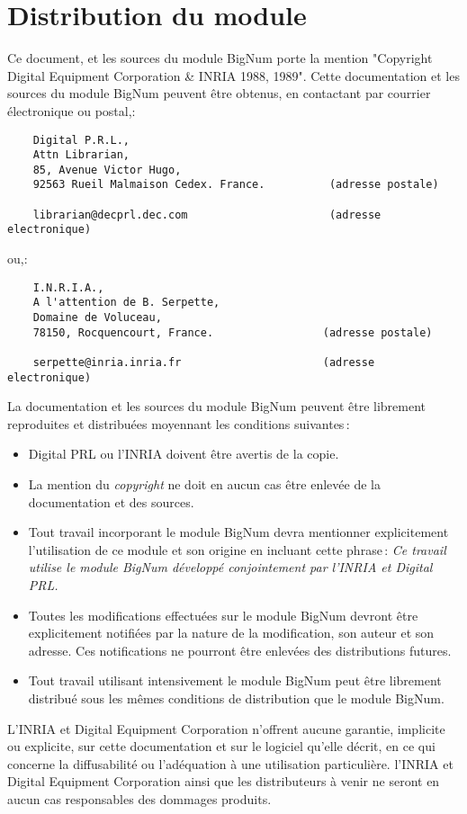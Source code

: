 \section{Distribution du module}
Ce document, et les sources du module BigNum porte la mention
"Copyright Digital Equipment Corporation \& INRIA 1988, 1989".
Cette documentation et les sources du module BigNum peuvent \^etre
obtenus, en contactant par courrier \'electronique ou postal,:
\begin{verbatim}
    Digital P.R.L.,
    Attn Librarian,
    85, Avenue Victor Hugo,
    92563 Rueil Malmaison Cedex. France.          (adresse postale)

    librarian@decprl.dec.com                      (adresse electronique)
\end{verbatim}
  ou,:
\begin{verbatim}
    I.N.R.I.A.,
    A l'attention de B. Serpette,
    Domaine de Voluceau,
    78150, Rocquencourt, France.                 (adresse postale)

    serpette@inria.inria.fr                      (adresse electronique)
\end{verbatim}
La documentation et les sources du module BigNum peuvent \^etre
librement reproduites et distribu\'ees moyennant les conditions
suivantes\,:
\begin{itemize}
  \item Digital PRL ou l'INRIA doivent \^etre avertis de la copie.

  \item La mention du {\em copyright} ne doit en aucun cas \^etre enlev\'ee
    de la documentation et des sources.

  \item Tout travail incorporant le module BigNum devra mentionner
    explicitement l'utilisation de ce module et son origine en incluant cette
    phrase\,: {\em Ce travail utilise le module BigNum d\'evelopp\'e
    conjointement par l'INRIA et Digital PRL.}

  \item Toutes les modifications effectu\'ees sur le module BigNum devront
    \^etre explicitement notifi\'ees par la nature de la modification, son
    auteur et son adresse. Ces notifications ne pourront \^etre enlev\'ees
    des distributions futures.

  \item Tout travail utilisant intensivement le module BigNum peut \^etre
    librement distribu\'e sous les m\^emes conditions de distribution que le
    module BigNum.
\end{itemize}
L'INRIA et Digital Equipment Corporation n'offrent aucune garantie, implicite
ou explicite, sur cette documentation et sur le logiciel qu'elle d\'ecrit, en
ce qui concerne la diffusabilit\'e ou l'ad\'equation \`a une utilisation
particuli\`ere. l'INRIA et Digital Equipment Corporation ainsi que les
distributeurs \`a venir ne seront en aucun cas responsables des dommages
produits.

\tableofcontents


